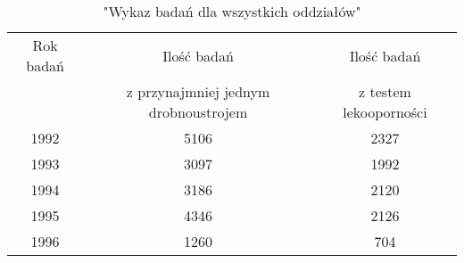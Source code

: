 \documentclass[a4paper,11pt]{article}
\begin{document}
\begin{table}[h]
\begin{center}
\caption{"Wykaz badań dla wszystkich oddziałów"}
\begin{tabular}{c|c|c}
\hline
Rok badań & Ilość badań & Ilość badań \\
& z przynajmniej jednym drobnoustrojem &z testem lekooporności \\
1992&5106&2327 \\
1993&3097&1992 \\
1994&3186&2120 \\
1995&4346&2126 \\
1996&1260&704 \\
\hline
\end{tabular}
\end{center}
\end{table}
\end{document}
